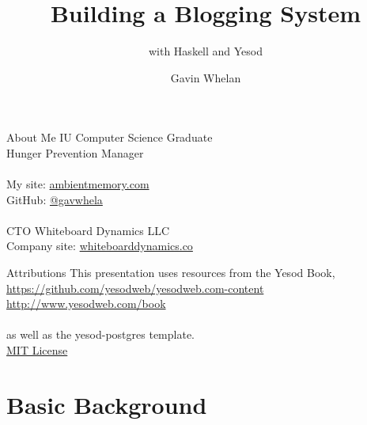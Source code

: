 \documentclass[pdf]{beamer}
\title{Building a Blogging System}
\subtitle{with Haskell and Yesod}
\author{Gavin Whelan}
\begin{document}
\begin{frame}
  \titlepage
\end{frame}

\begin{frame}{About Me}
  IU Computer Science Graduate\\
  Hunger Prevention Manager\\
  \\
  My site: \href{https://ambientmemory.com}{ambientmemory.com}\\
  GitHub: \href{https://github.com/gavwhela}{@gavwhela}\\
  \\
  CTO Whiteboard Dynamics LLC\\
  Company site: \href{https://whiteboarddynamics.co}{whiteboarddynamics.co}\\
\end{frame}

\begin{frame}{Attributions}
  This presentation uses resources from the Yesod Book,\\
  \url{https://github.com/yesodweb/yesodweb.com-content}\\
  \url{http://www.yesodweb.com/book}\\
  \\
  as well as the yesod-postgres template.\\
  \href{https://github.com/commercialhaskell/stack-templates/blob/master/LICENSE}{MIT License}\\
\end{frame}

\section{Basic Background}
\end{document}
